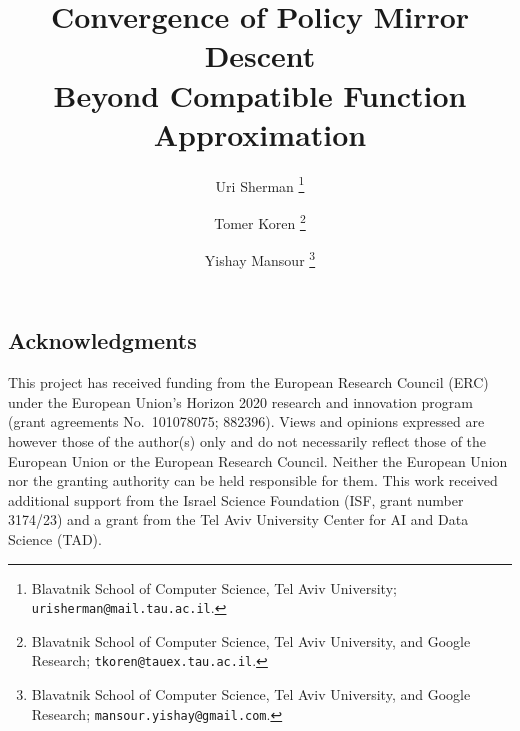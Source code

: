 \documentclass[11pt]{article}
\title{Convergence of Policy Mirror Descent \\
Beyond Compatible Function Approximation}
\author{
Uri Sherman%
\thanks{Blavatnik School of Computer Science, Tel Aviv University; \texttt{urisherman@mail.tau.ac.il}.
}
\and
Tomer Koren%
\thanks{Blavatnik School of Computer Science, Tel Aviv University, and Google Research; \texttt{tkoren@tauex.tau.ac.il}.}
\and
Yishay Mansour%
\thanks{Blavatnik School of Computer Science, Tel Aviv University, and Google Research; \texttt{mansour.yishay@gmail.com}. 
}
}
\begin{document}
\maketitle



\subsection*{Acknowledgments}
This project has received funding from the European Research Council (ERC) under the European Union’s Horizon 2020 research and innovation program (grant agreements No.\ 101078075; 882396).
Views and opinions expressed are however those of the author(s) only and do not necessarily reflect those of the European Union or the European Research Council. Neither the European Union nor the granting authority can be held responsible for them.
This work received additional support from the Israel Science Foundation (ISF, grant number 3174/23) 
and a grant from the Tel Aviv University Center for AI and Data Science (TAD).



\appendix


\end{document}
